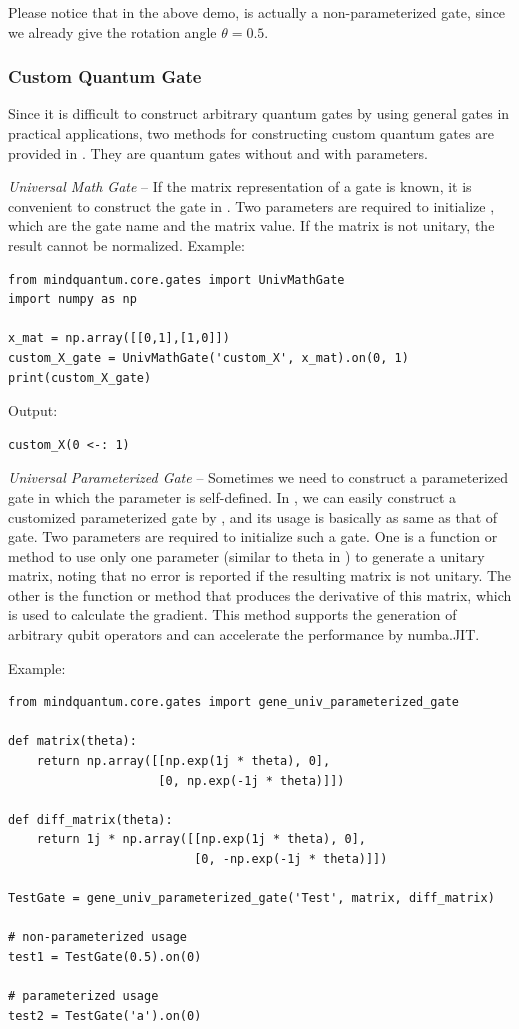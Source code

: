 Please notice that in the above demo,  is actually a non-parameterized gate, since we already give the rotation angle $\theta = 0.5$.

\subsubsection{Custom Quantum Gate}
Since it is difficult to construct arbitrary quantum gates by using general gates in practical applications, two methods for constructing custom quantum gates are provided in \MindQuantum. They are quantum gates without and with parameters.

\textit{Universal Math Gate} -- If the matrix representation of a gate is known, it is convenient to construct the gate in \MindQuantum. Two parameters are required to initialize \UnivMathGate, which are the gate name and the matrix value. If the matrix is not unitary, the result cannot be normalized.
Example:
\begin{lstlisting}
from mindquantum.core.gates import UnivMathGate
import numpy as np

x_mat = np.array([[0,1],[1,0]])
custom_X_gate = UnivMathGate('custom_X', x_mat).on(0, 1)
print(custom_X_gate)
\end{lstlisting}
Output:
\begin{lstlisting}
custom_X(0 <-: 1)
\end{lstlisting}

\textit{Universal Parameterized Gate} -- Sometimes we need to construct a parameterized gate in which the parameter is self-defined. In \MindQuantum, we can easily construct a customized parameterized gate by \geneunivparameterizedgate, and its usage is basically as same as that of \RX gate. Two parameters are required to initialize such a gate. One is a function or method to use only one parameter (similar to theta in \RX) to generate a unitary matrix, noting that no error is reported if the resulting matrix is not unitary. The other is the function or method that produces the derivative of this matrix, which is used to calculate the gradient. This method supports the generation of arbitrary qubit operators and can accelerate the performance by numba.JIT.

Example:
\begin{lstlisting}
from mindquantum.core.gates import gene_univ_parameterized_gate

def matrix(theta):
    return np.array([[np.exp(1j * theta), 0],
                     [0, np.exp(-1j * theta)]])

def diff_matrix(theta):
    return 1j * np.array([[np.exp(1j * theta), 0],
                          [0, -np.exp(-1j * theta)]])

TestGate = gene_univ_parameterized_gate('Test', matrix, diff_matrix)

# non-parameterized usage
test1 = TestGate(0.5).on(0)

# parameterized usage
test2 = TestGate('a').on(0)
\end{lstlisting}

